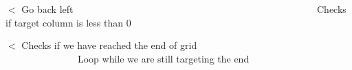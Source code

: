 $<$ Go back left ~\newline
~\newline
~\newline
~\newline
~\newline
~\newline
~\newline
~\newline
~\newline
~\newline
~\newline
~\newline
~\newline
~\newline
~\newline
~\newline
~\newline
~\newline
~\newline
~\newline
~\newline
~\newline
~\newline
~\newline
~\newline
~\newline
~\newline
~\newline
~\newline
~\newline
 Checks if target column is less than 0

$<$ Checks if we have reached the end of grid ~\newline
~\newline
~\newline
~\newline
~\newline
~\newline
~\newline
~\newline
~\newline
~\newline
~\newline
~\newline
~\newline
~\newline
~\newline
~\newline
~\newline
~\newline
~\newline
~\newline
~\newline
~\newline
~\newline
~\newline
~\newline
~\newline
~\newline
~\newline
 Loop while we are still targeting the end

